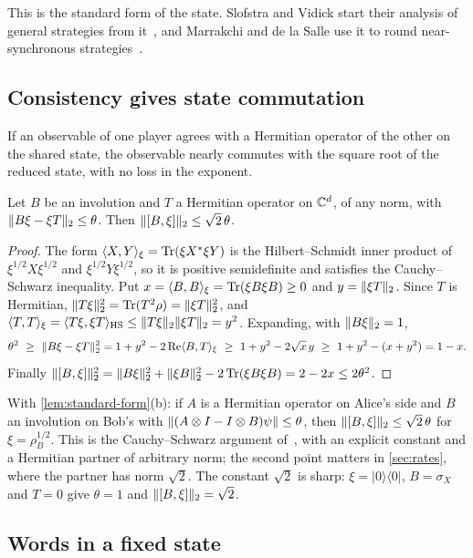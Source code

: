 This is the standard form of the state. Slofstra and Vidick start their analysis of general strategies from it~\cite[proof of
Proposition~5.4]{SV18}, and Marrakchi and de la Salle use it to round near-synchronous strategies~\cite{MdlS23}.

\subsection{Consistency gives state commutation}

If an observable of one player agrees with a Hermitian operator of the other on the shared state, the observable nearly commutes with the
square root of the reduced state, with no loss in the exponent.

\begin{lemma}[Consistency]\label{lem:consistency}
Let $B$ be an involution and $T$ a Hermitian operator on $\mathbb C^d$, of any norm, with $\lVert B\xi-\xi T\rVert_2\le\theta$. Then
$\lVert [B,\xi]\rVert_2\le\sqrt2\,\theta$.
\end{lemma}

\begin{proof}
The form $\langle X,Y\rangle_\xi=\operatorname{Tr}(\xi X^*\xi Y)$ is the Hilbert--Schmidt inner product of $\xi^{1/2}X\xi^{1/2}$ and $\xi^{1/2}Y\xi^{1/2}$, so
it is positive semidefinite and satisfies the Cauchy--Schwarz inequality. Put $x=\langle B,B\rangle_\xi=\operatorname{Tr}(\xi B\xi B)\ge0$ and
$y=\lVert \xi T\rVert_2$. Since $T$ is Hermitian, $\lVert T\xi\rVert_2^2=\operatorname{Tr}(T^2\rho)=\lVert \xi T\rVert_2^2$, and
$\langle T,T\rangle_\xi=\langle T\xi,\xi T\rangle_{\mathrm{HS}}\le\lVert T\xi\rVert_2\lVert \xi T\rVert_2=y^2$. Expanding, with $\lVert B\xi\rVert_2=1$,
\[
\theta^2\ \ge\ \lVert B\xi-\xi T\rVert_2^2=1+y^2-2\operatorname{Re}\langle B,T\rangle_\xi\ \ge\ 1+y^2-2\sqrt x\,y\ \ge\ 1+y^2-(x+y^2)=1-x .
\]
Finally $\lVert [B,\xi]\rVert_2^2=\lVert B\xi\rVert_2^2+\lVert \xi B\rVert_2^2-2\operatorname{Tr}(\xi B\xi B)=2-2x\le2\theta^2$.
\end{proof}

With \cref{lem:standard-form}(b): if $A$ is a Hermitian operator on Alice's side and $B$ an involution on Bob's with
$\lVert (A\otimes I-I\otimes B)\psi\rVert\le\theta$, then $\lVert [B,\xi]\rVert_2\le\sqrt2\,\theta$ for $\xi=\rho_B^{1/2}$. This is the Cauchy--Schwarz
argument of~\cite[proof of Proposition~5.4, (5.1)]{SV18}, with an explicit constant and a Hermitian partner of arbitrary norm; the second
point matters in \cref{sec:rates}, where the partner has norm $\sqrt2$. The constant $\sqrt2$ is sharp: $\xi=|0\rangle\langle0|$,
$B=\sigma_X$ and $T=0$ give $\theta=1$ and $\lVert [B,\xi]\rVert_2=\sqrt2$.

\subsection{Words in a fixed state}

